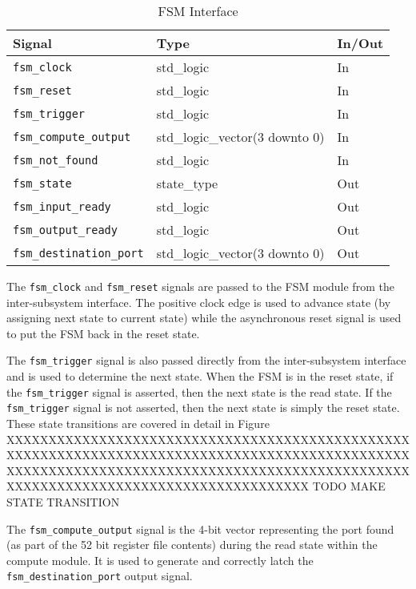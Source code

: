 \documentclass{article}
\begin{document}
\begin{table}[ht]
    \begin{center}
        \begin{tabular}{lll}\hline
        Signal & Type & In/Out \\
        \hline
        \texttt{fsm\_clock} & std\_logic & In \\
        \hline
        \texttt{fsm\_reset} & std\_logic & In \\
        \hline
        \texttt{fsm\_trigger} & std\_logic & In \\
        \hline
        \texttt{fsm\_compute\_output} & std\_logic\_vector(3 downto 0) & In \\
        \hline
        \texttt{fsm\_not\_found} & std\_logic & In \\
        \hline
        \texttt{fsm\_state} & state\_type & Out \\
        \hline
        \texttt{fsm\_input\_ready} & std\_logic & Out \\
        \hline
        \texttt{fsm\_output\_ready} & std\_logic & Out \\
        \hline
        \texttt{fsm\_destination\_port} & std\_logic\_vector(3 downto 0) & Out \\
        \hline
        \end{tabular}
        \caption{FSM Interface}\label{tab:fsm}
    \end{center}
\end{table}

The \texttt{fsm\_clock} and \texttt{fsm\_reset} signals are passed to the FSM module from the inter-subsystem interface. The positive clock edge is used to advance state (by assigning next state to current state) while the asynchronous reset signal is used to put the FSM back in the reset state. 

The \texttt{fsm\_trigger} signal is also passed directly from the inter-subsystem interface and is used to determine the next state. When the FSM is in the reset state, if the \texttt{fsm\_trigger} signal is asserted, then the next state is the read state. If the \texttt{fsm\_trigger} signal is not asserted, then the next state is simply the reset state. These state transitions are covered in detail in Figure XXXXXXXXXXXXXXXXXXXXXXXXXXXXXXXXXXXXXXXXXXXXXXXXXXXXXXXXXXXXXXXXXXXXXXXXXXXXXXXXXXXXXXXXXXXXXXXXXXXXXXXXXXXXXXXXXXXXXXXXXXXXXXXXXXXXXXXXXXXXXXXXXXXXXXXXXXXXXXXXXXXXXXXXXXXXXXXXXXXX TODO MAKE STATE TRANSITION

The \texttt{fsm\_compute\_output} signal is the 4-bit vector representing the port found (as part of the 52 bit register file contents) during the read state within the compute module. It is used to generate and correctly latch the \texttt{fsm\_destination\_port} output signal.
\end{document}
